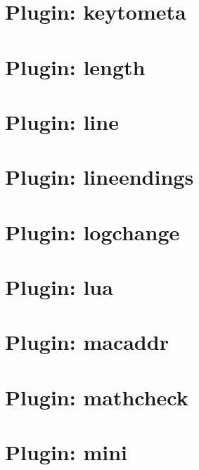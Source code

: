 \let\mypdfximage\pdfximage\def\pdfximage{\immediate\mypdfximage}\documentclass[twoside]{book}
\newcommand{\+}{\discretionary{\mbox{\scriptsize$\hookleftarrow$}}{}{}}
\begin{document}
\chapter{Plugin\+: keytometa}
\label{md_src_plugins_keytometa_README}

\chapter{Plugin\+: length}
\label{md_src_plugins_length_README}

\chapter{Plugin\+: line}
\label{md_src_plugins_line_README}

\chapter{Plugin\+: lineendings}
\label{md_src_plugins_lineendings_README}

\chapter{Plugin\+: logchange}
\label{md_src_plugins_logchange_README}

\chapter{Plugin\+: lua}
\label{md_src_plugins_lua_README}

\chapter{Plugin\+: macaddr}
\label{md_src_plugins_macaddr_README}

\chapter{Plugin\+: mathcheck}
\label{md_src_plugins_mathcheck_README}

\chapter{Plugin\+: mini}
\label{md_src_plugins_mini_README}

\end{document}
